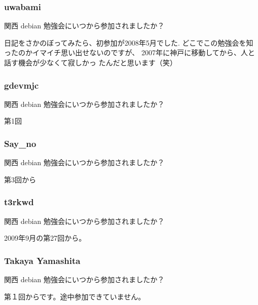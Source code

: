 \documentclass[cjk,dvipdfmx,10pt,compress,%
hyperref={bookmarks=true,bookmarksnumbered=true,bookmarksopen=false,%
colorlinks=false,%
pdftitle={第 121 回 関西 Debian 勉強会},%
pdfauthor={倉敷・のがた・佐々木・かわだ},%
pdfsubject={資料},%
}]{beamer}
\begin{document}
\begin{frame}[fragile]
  \frametitle{uwabami}
    \begin{block}{関西 debian 勉強会にいつから参加されましたか？}
        \begin{description}
            \item 日記をさかのぼってみたら、初参加が2008年5月でした.
              どこでこの勉強会を知ったのかイマイチ思い出せないのですが、
              2007年に神戸に移動してから、人と話す機会が少なくて寂しかっ
              たんだと思います（笑）
        \end{description}
    \end{block}
\end{frame}

\begin{frame}[fragile]
  \frametitle{gdevmjc}
    \begin{block}{関西 debian 勉強会にいつから参加されましたか？}
        \begin{description}
            \item 第1回
        \end{description}
    \end{block}
\end{frame}

\begin{frame}[fragile]
  \frametitle{Say\_no}
    \begin{block}{関西 debian 勉強会にいつから参加されましたか？}
        \begin{description}
            \item 第3回から
        \end{description}
    \end{block}
\end{frame}

\begin{frame}[fragile]
  \frametitle{t3rkwd}
    \begin{block}{関西 debian 勉強会にいつから参加されましたか？}
        \begin{description}
            \item 2009年9月の第27回から。
        \end{description}
    \end{block}
\end{frame}

\begin{frame}[fragile]
  \frametitle{Takaya Yamashita}
    \begin{block}{関西 debian 勉強会にいつから参加されましたか？}
        \begin{description}
            \item 第１回からです。途中参加できていません。
        \end{description}
    \end{block}
\end{frame}
\end{document}
